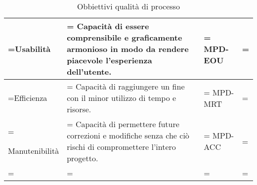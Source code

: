 \begin{xltabular}{\textwidth} {
        >{\hsize\linewidth=\hsize}X
        >{\hsize\linewidth=\hsize}X
        >{\hsize\linewidth=\hsize}X
        >{\hsize\linewidth=\hsize}X
    }
    Usabilità &
    Capacità di essere comprensibile e graficamente
    armonioso in modo da rendere piacevole l'esperienza
    dell'utente. &
    MPD-EOU
    \\ \hline

    Efficienza &
    Capacità di raggiungere un fine con il minor utilizzo di
    tempo e risorse. &
    MPD-MRT
    \\ \hline

    Manutenibilità &
    Capacità di permettere future correzioni e modifiche
    senza che ciò rischi di compromettere l'intero progetto. &
    MPD-ACC
    \\ \hline

    \caption{Obbiettivi qualità di processo}
\end{xltabular}